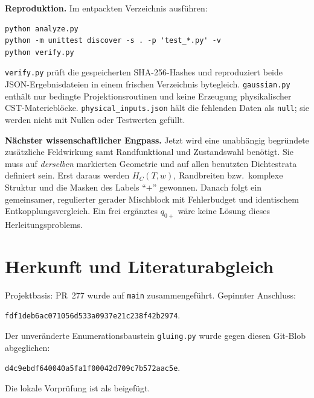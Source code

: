 \documentclass[10pt,a4paper]{article}
\newcommand{\sect}[1]{\section*{\color{navy}#1}}
\begin{document}
\textbf{Reproduktion.} Im entpackten Verzeichnis ausführen:
\begin{verbatim}
python analyze.py
python -m unittest discover -s . -p 'test_*.py' -v
python verify.py
\end{verbatim}
\texttt{verify.py} prüft die gespeicherten SHA-256-Hashes und reproduziert
beide JSON-Ergebnisdateien in einem frischen Verzeichnis bytegleich.
\texttt{gaussian.py} enthält nur bedingte Projektionsroutinen und keine
Erzeugung physikalischer CST-Materieblöcke. \texttt{physical\_inputs.json}
hält die fehlenden Daten als \texttt{null}; sie werden nicht mit Nullen
oder Testwerten gefüllt.

\textbf{Nächster wissenschaftlicher Engpass.}
Jetzt wird eine unabhängig begründete zusätzliche Feldwirkung samt
Randfunktional und Zustandswahl benötigt. Sie muss auf \emph{derselben}
markierten Geometrie und auf allen benutzten Dichtestrata definiert sein.
Erst daraus werden $H_C(T,w)$, Randbreiten bzw.~komplexe Struktur und
die Masken des Labels ``$+$'' gewonnen. Danach folgt ein gemeinsamer,
regulierter gerader Mischblock mit Fehlerbudget und identischem
Entkopplungsvergleich. Ein frei ergänztes $q_{0+}$ wäre keine Lösung
dieses Herleitungsproblems.

\sect{Herkunft und Literaturabgleich}
Projektbasis: PR~277 wurde auf \texttt{main} zusammengeführt. Gepinnter Anschluss:
\par{\footnotesize\texttt{fdf1deb6ac071056d533a0937e21c238f42b2974}}.
\par Der unveränderte Enumerationsbaustein \texttt{gluing.py} wurde gegen diesen Git-Blob abgeglichen:
\par{\footnotesize\texttt{d4c9ebdf640040a5fa1f00042d709c7b572aac5e}}.
\par Die lokale Vorprüfung ist als  beigefügt.
\end{document}
